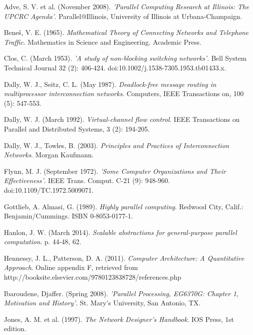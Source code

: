 \documentclass[a4paper, 12pt]{article}
\begin{document}
\begin{thebibliography}{30}

 Adve, S. V. et al. (November 2008). \textit{'Parallel Computing Research at Illinois: The UPCRC Agenda'}. Parallel@Illinois, University of Illinois at Urbana-Champaign.

 Bene\v{s}, V. E. (1965). \textit{Mathematical Theory of Connecting Networks and Telephone Traffic}. Mathematics in Science and Engineering. Academic Press.

 Clos, C. (March 1953). \textit{'A study of non-blocking switching networks'}. Bell System Technical Journal 32 (2): 406-424. doi:10.1002/j.1538-7305.1953.tb01433.x.

 Dally, W. J., Seitz, C. L. (May 1987). \textit{Deadlock-free message routing in multiprocessor interconnection networks}. Computers, IEEE Transactions on, 100 (5): 547-553.

 Dally, W. J. (March 1992). \textit{Virtual-channel flow control}. IEEE Transactions on Parallel and Distributed Systems, 3 (2): 194-205.

 Dally, W. J., Towles, B. (2003). \textit{Principles and Practices of Interconnection Networks}. Morgan Kaufmann.

 Flynn, M. J. (September 1972). \textit{'Some Computer Organizations and Their Effectiveness'}. IEEE Trans. Comput. C-21 (9): 948-960. doi:10.1109/TC.1972.5009071.

 Gottlieb, A. Almasi, G. (1989). \textit{Highly parallel computing}. Redwood City, Calif.: Benjamin/Cummings. ISBN 0-8053-0177-1.

 Hanlon, J. W. (March 2014). \textit{Scalable abstractions for general-purpose parallel computation}. p. 44-48, 62.

 Hennessy, J. L., Patterson, D. A. (2011). \textit{Computer Architecture: A Quantitative Approach}. Online appendix F, retrieved from http://booksite.elsevier.com/9780123838728/references.php

 Ibaroudene, Djaffer. (Spring 2008). \textit{'Parallel Processing, EG6370G: Chapter 1, Motivation and History'}. St. Mary's University, San Antonio, TX.

 Jones, A. M. et al. (1997). \textit{The Network Designer's Handbook}. IOS Press, 1st edition.


\end{thebibliography}
\end{document}
